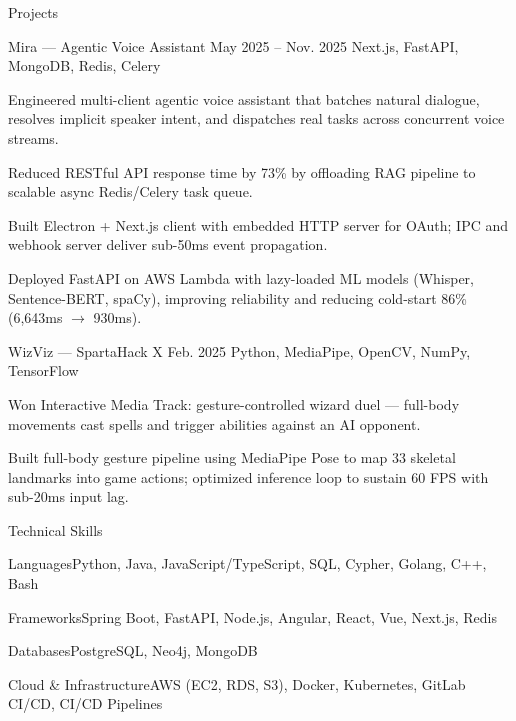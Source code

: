 \documentclass[
	11pt
]{../../../resume}
\begin{document}
	\begin{rSection}{P}{rojects}
		\begin{rSectionEntry}
			{Mira --- Agentic Voice Assistant}
			{May 2025 -- Nov. 2025}
			{}
			{Next.js, FastAPI, MongoDB, Redis, Celery}
			{}

			\item Engineered multi-client agentic voice assistant that batches natural dialogue, resolves implicit speaker intent, and dispatches real tasks across concurrent voice streams.
			\item Reduced RESTful API response time by 73\% by offloading RAG pipeline to scalable async Redis/Celery task queue.
			\item Built Electron + Next.js client with embedded HTTP server for OAuth; IPC and webhook server deliver sub-50ms event propagation.
			\item Deployed FastAPI on AWS Lambda with lazy-loaded ML models (Whisper, Sentence-BERT, spaCy), improving reliability and reducing cold-start 86\% (6{,}643ms $\rightarrow$ 930ms).
		\end{rSectionEntry}

		\begin{rSectionEntry}
			{WizViz --- SpartaHack X}
			{Feb. 2025}
			{}
			{Python, MediaPipe, OpenCV, NumPy, TensorFlow}
			{}

			\item Won Interactive Media Track: gesture-controlled wizard duel — full-body movements cast spells and trigger abilities against an AI opponent.
			\item Built full-body gesture pipeline using MediaPipe Pose to map 33 skeletal landmarks into game actions; optimized inference loop to sustain 60 FPS with sub-20ms input lag.
		\end{rSectionEntry}
	\end{rSection}

	\begin{rSection}{T}{echnical Skills}
		\begin{rSet}{Languages}{Python, Java, JavaScript/TypeScript, SQL, Cypher, Golang, C++, Bash}
		\end{rSet}
		\begin{rSet}{Frameworks}{Spring Boot, FastAPI, Node.js, Angular, React, Vue, Next.js, Redis}
		\end{rSet}
		\begin{rSet}{Databases}{PostgreSQL, Neo4j, MongoDB}
		\end{rSet}
		\begin{rSet}{Cloud \& Infrastructure}{AWS (EC2, RDS, S3), Docker, Kubernetes, GitLab CI/CD, CI/CD Pipelines}
		\end{rSet}
	\end{rSection}
\end{document}
